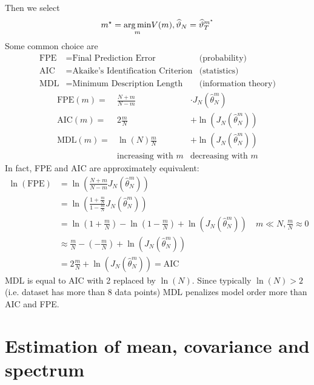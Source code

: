 Then we select
\begin{equation*}
m^{\star} =\underset{m}{\operatorname*{arg\,min}} V(m) ,\widehat{\vartheta }_{N} =\widehat{\vartheta }_{T}^{m^{\star}}
\end{equation*}
Some common choice are
\begin{align*}
\text{FPE} & =\text{Final Prediction Error} & \text{(probability)}\\
\text{AIC} & =\text{Akaike's Identification Criterion} & \text{(statistics)}\\
\text{MDL} & =\text{Minimum Description Length} & \text{(information theory)}
\end{align*}
\begin{equation*}
	\begin{array}{rcc}
		\text{FPE}(m) = & \frac{N+m}{N-m}          &  \cdot J_{N}(\hat{\theta }_{N}^{m})\\
		\text{AIC}(m) = & 2\frac{m}{N}             &  +\ln(J_{N}(\hat{\theta }_{N}^{m}))\\
		\text{MDL}(m) = & \ln(N)\frac{m}{N}        &  +\ln(J_{N}(\hat{\theta }_{N}^{m}))\\
		                & \text{increasing with }m &  \text{decreasing with }m
	\end{array}
\end{equation*}
In fact, FPE and AIC are approximately equivalent:
\begin{align*}
\ln(\text{FPE}) & =\ln\left(\frac{N+m}{N-m} J_{N}(\hat{\theta }_{N}^{m})\right) \\
 & =\ln\left(\frac{1+\frac{m}{N}}{1-\frac{m}{N}} J_{N}(\hat{\theta }_{N}^{m})\right) \\
 & =\ln\left(1+\frac{m}{N}\right) -\ln\left(1-\frac{m}{N}\right) +\ln(J_{N}(\hat{\theta }_{N}^{m})) \quad m\ll N, \frac{m}{N} \approx 0\\
 & \approx \frac{m}{N} -\left(-\frac{m}{N}\right) +\ln(J_{N}(\hat{\theta }_{N}^{m})) \\
 & =2\frac{m}{N} +\ln(J_{N}(\hat{\theta }_{N}^{m})) = \text{AIC} & 
\end{align*}
MDL is equal to AIC with 2 replaced by $ \ln(N)$. Since typically $ \ln(N)  >2$ (i.e. dataset has more than 8 data points) MDL penalizes model order more than AIC and FPE.



\section{Estimation of mean, covariance and spectrum}

